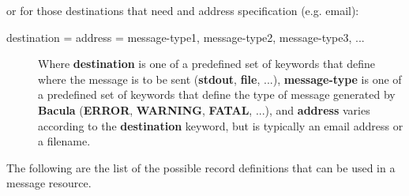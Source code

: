 or for those destinations that need and address specification (e.g. email): 

\begin{description}

\item [destination = address = message-type1, message-type2,
   message-type3, ...  ]

   Where {\bf destination} is one of a predefined set of keywords that define
   where the message is to be sent ({\bf stdout}, {\bf file}, ...), {\bf
   message-type} is one of a predefined set of keywords that define the type of
   message generated by {\bf Bacula} ({\bf ERROR}, {\bf WARNING}, {\bf FATAL},
   ...), and {\bf address} varies according to the {\bf destination} keyword, but
   is typically an email address or a filename. 
\end{description}

The following are the list of the possible record definitions that can be used
in a message resource. 

